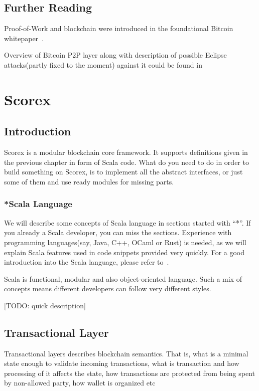 \documentclass[]{report}   %
\begin{document}
\section{Further Reading}

Proof-of-Work and blockchain were introduced in the foundational Bitcoin whitepaper~\cite{Nakamoto2008}.

Overview of Bitcoin P2P layer along with description of possible Eclipse attacks(partly fixed to the moment) against it could be found in~\cite{heilman2015eclipse}


\chapter{Scorex}           %
\section{Introduction}     %

Scorex is a modular blockchain core framework. It supports definitions given in the previous chapter in form of Scala code. What do you need to do in order to build something on Scorex, is to implement all the abstract interfaces, or just some of them and use ready modules for missing parts.

\subsection{*Scala Language}         %

We will describe some concepts of Scala language in sections started with ``*''. If you already a Scala developer, you can miss the sections. Experience with programming languages(say, Java, C++, OCaml or Rust) is needed, as we will explain Scala features used in code snippets provided very quickly. For a good introduction into the Scala language, please refer to~\cite{?}.

Scala is functional, modular and also object-oriented language. Such a mix of concepts means different developers can follow very different styles. 

[TODO: quick description]

\section{Transactional Layer}

Transactional layers describes blockchain semantics. That is, what is a minimal state enough to validate incoming transactions, what is transaction and how processing of it affects the state, how transactions are protected from being spent by non-allowed party, how wallet is organized etc
\end{document}
